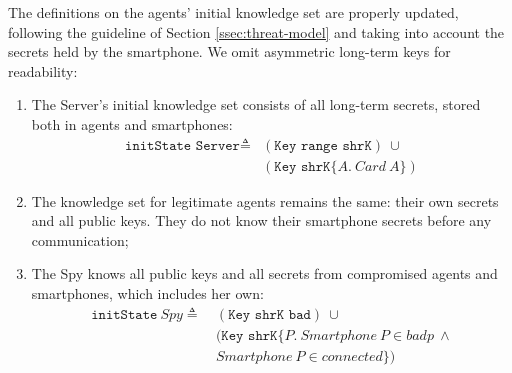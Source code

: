 The definitions on the agents' initial knowledge set are properly updated, following the guideline of Section \ref{ssec:threat-model} and taking into account the secrets held by the smartphone. We omit asymmetric long-term keys for readability:
%
\begin{enumerate}
  \item The Server's initial knowledge set consists of all long-term secrets, stored both in agents and smartphones:
  \begin{equation*}
    \begin{split}
      \texttt{initState Server} \triangleq
      & (\texttt{Key range shrK}) \ \cup \\
      & (\texttt{Key shrK}\{A.\ Card\ A\})
    \end{split}
  \end{equation*}
  \item The knowledge set for legitimate agents remains the same: their own secrets and all public keys. They do not know their smartphone secrets before any communication;

  \item The Spy knows all public keys and all secrets from compromised agents and smartphones, which includes her own:
  \begin{equation*}
    \begin{split}
      \texttt{initState}\ Spy \triangleq\
      & (\texttt{Key shrK bad}) \ \cup \\
      & (\texttt{Key shrK}\{P.\ Smartphone\ P \in badp\ \wedge \\
      & Smartphone\ P \in connected\})
    \end{split}
  \end{equation*}
\end{enumerate}

